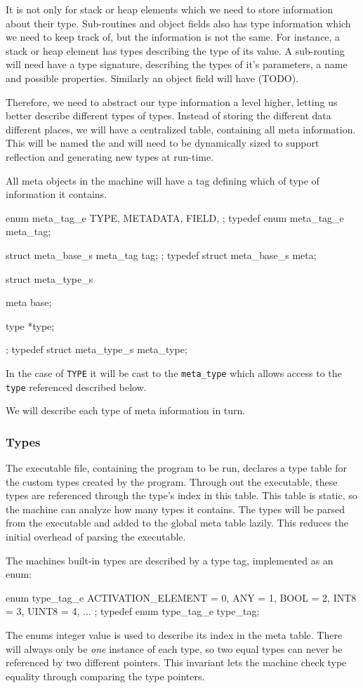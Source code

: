 It is not only for stack or heap elements which we need to store information
about their type. Sub-routines and object fields also has type information which
we need to keep track of, but the information is not the same. For instance, a
stack or heap element has types describing the type of its value. A sub-routing
will need have a type signature, describing the types of it's parameters, a name
and possible properties. Similarly an object field will have (TODO).

Therefore, we need to abstract our type information a level higher, letting us
better describe different types of types. Instead of storing the different data
different places, we will have a centralized table, containing all meta
information. This will be named the  and will need to be
dynamically sized to support reflection and generating new types at run-time.

All meta objects in the machine will have a tag defining which of type of
information it contains.
\begin{ccode}
enum meta_tag_e {
    TYPE,
    METADATA,
    FIELD,
};
typedef enum meta_tag_e meta_tag;

struct meta_base_s {
    meta_tag tag;
};
typedef struct meta_base_s meta;

struct meta_type_s {
    meta base;

    type *type;
};
typedef struct meta_type_s meta_type;
\end{ccode}
In the case of {\tt TYPE} it will be cast to the {\tt meta\_type} which allows
access to the {\tt type} referenced described below.

We will describe each type of meta information in turn.

\subsubsection{Types}
The executable file, containing the program to be run, declares a type table for
the custom types created by the program. Through out the executable, these types
are referenced through the type's index in this table. This table is static, so
the machine can analyze how many types it contains. The types will be parsed
from the executable and added to the global meta table lazily. This reduces
the initial overhead of parsing the executable.

The machines built-in types are described by a type tag, implemented as an enum:
\begin{ccode}
enum type_tag_e {
    ACTIVATION_ELEMENT = 0,
    ANY                = 1,
    BOOL               = 2,
    INT8               = 3,
    UINT8              = 4,
    ...
};
typedef enum type_tag_e type_tag;
\end{ccode}
The enums integer value is used to describe its index in the meta table. There
will always only be {\it one} instance of each type, so two equal types can
never be referenced by two different pointers. This invariant lets the machine
check type equality through comparing the type pointers.

